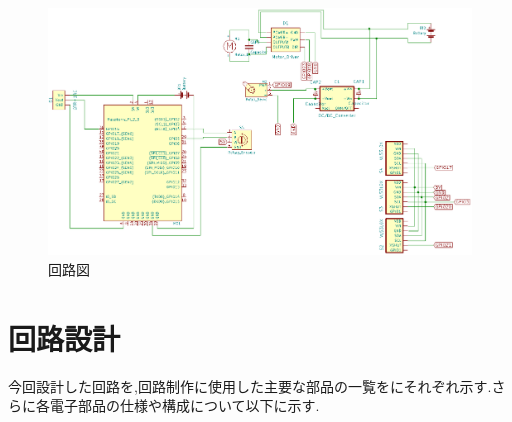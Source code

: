 \begin{figure}[h]
\centering
\includegraphics[scale=0.6]{picture/eps/ele_circuit_fig1.eps}
\caption{回路図}
\label{fig::overall_electric_circuit}
\end{figure}
\section{回路設計}
今回設計した回路を,回路制作に使用した主要な部品の一覧をにそれぞれ示す.さらに各電子部品の仕様や構成について以下に示す.

